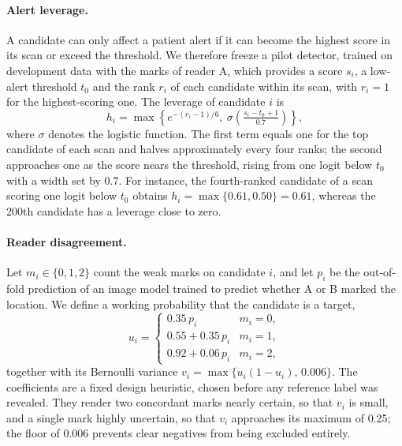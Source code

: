 \paragraph{Alert leverage.}
A candidate can only affect a patient alert if it can become the highest score in its scan or exceed the threshold. We therefore freeze a pilot detector, trained on development data with the marks of reader A, which provides a score $s_i$, a low-alert threshold $t_0$ and the rank $r_i$ of each candidate within its scan, with $r_i=1$ for the highest-scoring one. The leverage of candidate $i$ is
\begin{equation}
 h_i=\max\!\left\{e^{-(r_i-1)/6},\ \sigma\!\left(\tfrac{s_i-t_0+1}{0.7}\right)\right\},
 \label{eq:leverage}
\end{equation}
where $\sigma$ denotes the logistic function. The first term equals one for the top candidate of each scan and halves approximately every four ranks; the second approaches one as the score nears the threshold, rising from one logit below $t_0$ with a width set by $0.7$. For instance, the fourth-ranked candidate of a scan scoring one logit below $t_0$ obtains $h_i=\max\{0.61,0.50\}=0.61$, whereas the 200th candidate has a leverage close to zero.

\paragraph{Reader disagreement.}
Let $m_i\in\{0,1,2\}$ count the weak marks on candidate $i$, and let $p_i$ be the out-of-fold prediction of an image model trained to predict whether A or B marked the location. We define a working probability that the candidate is a target,
\begin{equation}
 u_i=\begin{cases}0.35\,p_i & m_i=0,\\ 0.55+0.35\,p_i & m_i=1,\\ 0.92+0.06\,p_i & m_i=2,\end{cases}
 \label{eq:working}
\end{equation}
together with its Bernoulli variance $v_i=\max\{u_i(1-u_i),\,0.006\}$. The coefficients are a fixed design heuristic, chosen before any reference label was revealed. They render two concordant marks nearly certain, so that $v_i$ is small, and a single mark highly uncertain, so that $v_i$ approaches its maximum of 0.25; the floor of 0.006 prevents clear negatives from being excluded entirely.

